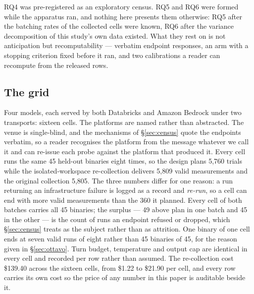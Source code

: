 RQ4 was pre-registered as an exploratory census. RQ5 and RQ6 were formed while the apparatus ran, and
nothing here presents them otherwise: RQ5 after the batching rates of the collected cells were known, RQ6
after the variance decomposition of this study's own data existed. What they rest on is not anticipation
but recomputability --- verbatim endpoint responses, an arm with a stopping criterion fixed before it ran,
and two calibrations a reader can recompute from the released rows.

\subsection{The grid}

Four models, each served by both Databricks and Amazon Bedrock under two transports: sixteen cells. The platforms are named rather than abstracted. The venue is single-blind, and the mechanisms of
\S\ref{sec:census} quote the endpoints verbatim, so a reader recognises the platform from the message
whatever we call it and can re-issue each probe against the platform that produced it. Every cell runs
the same 45 held-out binaries eight times, so the design plans 5{,}760 trials while the isolated-workspace
re-collection delivers 5{,}809 valid measurements and the original collection 5{,}805. The three numbers
differ for one reason: a run returning an infrastructure failure is logged as a record and \emph{re-run},
so a cell can end with more valid measurements than the 360 it planned. Every cell of both batches carries
all 45 binaries; the surplus --- 49 above plan in one batch and 45 in the other --- is the count of runs an
endpoint refused or dropped, which \S\ref{sec:census} treats as the subject rather than as attrition. One
binary of one cell ends at seven valid runs of eight rather than 45 binaries of 45, for the reason given in
\S\ref{sec:ottavo}. Turn budget, temperature and output cap are identical in every cell and recorded per
row rather than assumed. The re-collection cost \$139.40 across the sixteen cells, from \$1.22 to \$21.90
per cell, and every row carries its own cost so the price of any number in this paper is auditable beside
it.

